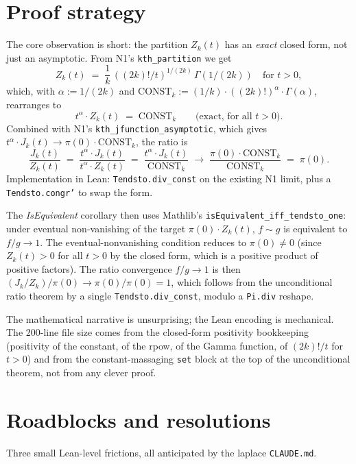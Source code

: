 \documentclass[11pt]{article}
\begin{document}
\section{Proof strategy}

The core observation is short: the partition $Z_k(t)$ has an
\emph{exact} closed form, not just an asymptotic. From N1's
\texttt{kth\_partition} we get
\[
  Z_k(t) \;=\; \frac{1}{k}\,((2k)!/t)^{1/(2k)}\,\Gamma(1/(2k))
  \quad\text{for } t > 0,
\]
which, with $\alpha := 1/(2k)$ and $\mathrm{CONST}_k := (1/k) \cdot
((2k)!)^\alpha \cdot \Gamma(\alpha)$, rearranges to
\[
  t^\alpha \cdot Z_k(t) \;=\; \mathrm{CONST}_k \qquad \text{(exact, for all } t > 0\text{)}.
\]
Combined with N1's \texttt{kth\_jfunction\_asymptotic}, which gives
$t^\alpha \cdot J_k(t) \to \pi(0) \cdot \mathrm{CONST}_k$, the ratio is
\[
  \frac{J_k(t)}{Z_k(t)} \;=\; \frac{t^\alpha \cdot J_k(t)}{t^\alpha \cdot Z_k(t)}
  \;=\; \frac{t^\alpha \cdot J_k(t)}{\mathrm{CONST}_k}
  \;\longrightarrow\; \frac{\pi(0) \cdot \mathrm{CONST}_k}{\mathrm{CONST}_k}
  \;=\; \pi(0).
\]
Implementation in Lean: \texttt{Tendsto.div\_const} on the existing
N1 limit, plus a \texttt{Tendsto.congr'} to swap the form.

The \emph{IsEquivalent} corollary then uses Mathlib's
\texttt{isEquivalent\_iff\_tendsto\_one}: under eventual non-vanishing of
the target $\pi(0) \cdot Z_k(t)$, $f \sim g$ is equivalent to $f/g \to
1$. The eventual-nonvanishing condition reduces to $\pi(0) \neq 0$
(since $Z_k(t) > 0$ for all $t > 0$ by the closed form, which is a
positive product of positive factors). The ratio convergence
$f/g \to 1$ is then $(J_k/Z_k)/\pi(0) \to \pi(0)/\pi(0) = 1$, which
follows from the unconditional ratio theorem by a single
\texttt{Tendsto.div\_const}, modulo a \texttt{Pi.div} reshape.

The mathematical narrative is unsurprising; the Lean encoding is
mechanical. The 200-line file size comes from the closed-form
positivity bookkeeping (positivity of the constant, of the rpow, of
the Gamma function, of $(2k)!/t$ for $t > 0$) and from the
constant-massaging \texttt{set} block at the top of the unconditional
theorem, not from any clever proof.

\section{Roadblocks and resolutions}

Three small Lean-level frictions, all anticipated by the laplace
\texttt{CLAUDE.md}.
\end{document}
